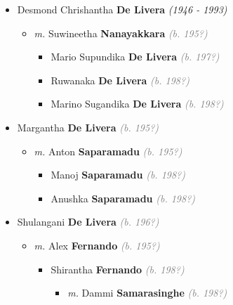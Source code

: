 \documentclass[10pt, openany]{book}
\begin{document}
\begin{itemize}
{\begin{itemize}
{\begin{itemize}
{\begin{itemize}
\item{Desmond Chrishantha \textbf{De Livera} \textcolor{slorange}{\textit{(1946 - 1993)}}
\begin{itemize}
\item{\textit{m.} Suwineetha \textbf{Nanayakkara} \textcolor{gray}{\textit{(b. 195?)}}   \label{couple:00002304:00002320} \begin{itemize}
\item{Mario Supundika \textbf{De Livera} \textcolor{gray}{\textit{(b. 197?)}}
   }
\item{Ruwanaka \textbf{De Livera} \textcolor{gray}{\textit{(b. 198?)}}
  }
\item{Marino Sugandika \textbf{De Livera} \textcolor{gray}{\textit{(b. 198?)}}
   }
\end{itemize}}
\end{itemize}
   }
\item{Margantha \textbf{De Livera} \textcolor{gray}{\textit{(b. 195?)}}
\begin{itemize}
\item{\textit{m.} Anton \textbf{Saparamadu} \textcolor{gray}{\textit{(b. 195?)}}   \label{couple:00002305:00002325} \begin{itemize}
\item{Manoj \textbf{Saparamadu} \textcolor{gray}{\textit{(b. 198?)}}
 }
\item{Anushka \textbf{Saparamadu} \textcolor{gray}{\textit{(b. 198?)}}
 }
\end{itemize}}
\end{itemize}
  }
\item{Shulangani \textbf{De Livera} \textcolor{gray}{\textit{(b. 196?)}}
\begin{itemize}
\item{\textit{m.} Alex \textbf{Fernando} \textcolor{gray}{\textit{(b. 195?)}}   \label{couple:00002302:00002306} \begin{itemize}
\item{Shirantha \textbf{Fernando} \textcolor{gray}{\textit{(b. 198?)}}
\begin{itemize}
\item{\textit{m.} Dammi \textbf{Samarasinghe} \textcolor{gray}{\textit{(b. 198?)}}   \label{couple:00002307:00002308} \begin{itemize}

\end{itemize}}
\end{itemize}}
\end{itemize}}
\end{itemize}}
\end{itemize}}
\end{itemize}}
\end{itemize}}
\end{itemize}
\end{document}
